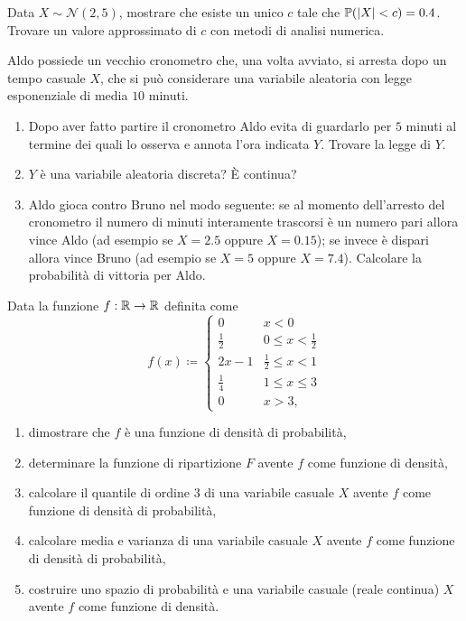 Data $X\sim \mathcal{N}(2,5)$, mostrare che esiste un unico $c$ tale che $\mathbb{P}(| X| < c) =0.4$. Trovare un valore approssimato di $c$ con metodi di analisi numerica.
\Esercizio{}

Aldo possiede un vecchio cronometro che, una volta avviato, si arresta dopo un tempo casuale $X$, che si può considerare una variabile aleatoria con legge esponenziale di media $10$ minuti.
\begin{enumerate}
\item Dopo aver fatto partire il cronometro Aldo evita di guardarlo per $5$ minuti al termine dei quali lo osserva e annota l'ora indicata $Y$. Trovare la legge di $Y$.
\item $Y$ è una variabile aleatoria discreta? È continua?
\item Aldo gioca contro Bruno nel modo seguente: se al momento dell'arresto del cronometro il numero di minuti interamente trascorsi è un numero pari allora vince Aldo (ad esempio se $X=2.5$ oppure $X=0.15$); se invece è dispari allora vince Bruno (ad esempio se $X=5$ oppure $X=7.4$). Calcolare la probabilità di vittoria per Aldo.
\end{enumerate}
\Esercizio{}

Data la funzione $f:\mathbb{R}\rightarrow \mathbb{R}$ definita come
\begin{equation*}
f(x) \coloneqq \begin{cases}
0 & x< 0\\
\frac{1}{2} & 0\leq x< \frac{1}{2}\\
2x-1 & \frac{1}{2} \leq x< 1\\
\frac{1}{4} & 1\leq x\leq 3\\
0 & x >3,
\end{cases}
\end{equation*}
\begin{enumerate}
\item dimostrare che $f$ è una funzione di densità di probabilità,
\item determinare la funzione di ripartizione $F$ avente $f$ come funzione di densità,
\item calcolare il quantile di ordine $3$ di una variabile casuale $X$ avente $f$ come funzione di densità di probabilità,
\item calcolare media e varianza di una variabile casuale $X$ avente $f$ come funzione di densità di probabilità,
\item costruire uno spazio di probabilità e una variabile casuale (reale continua) $X$ avente $f$ come funzione di densità.
\end{enumerate}


\ParteSoluzioni